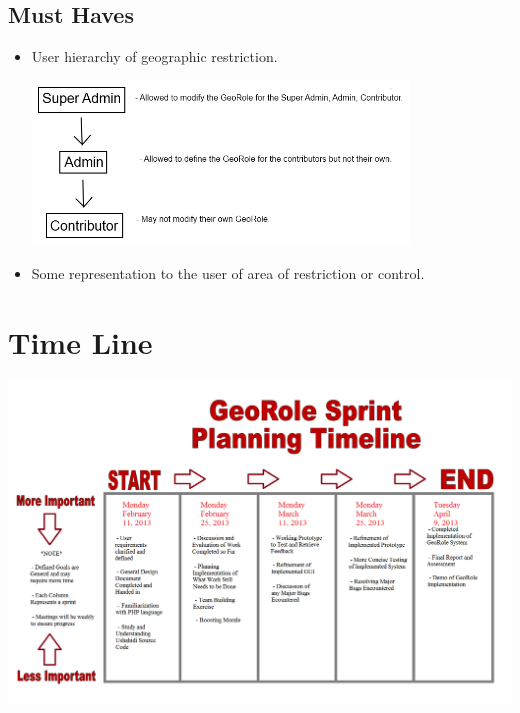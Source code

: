 \documentclass{article}
\begin{document}
\subsection{Must Haves}
\begin{itemize}
\item User hierarchy of geographic restriction.\\
\begin{minipage}{\linewidth}
  \centering
  \includegraphics[width=100mm]{permissions.png}
\end{minipage}
\item Some representation to the user of area of restriction or control.
\end{itemize}

\section{Time Line}
\begin{minipage}{\linewidth}
  \centering
  \hspace*{-1in}
  \includegraphics[width=180mm]{UshahidiTimeline.png}
\end{minipage}
\end{document}
